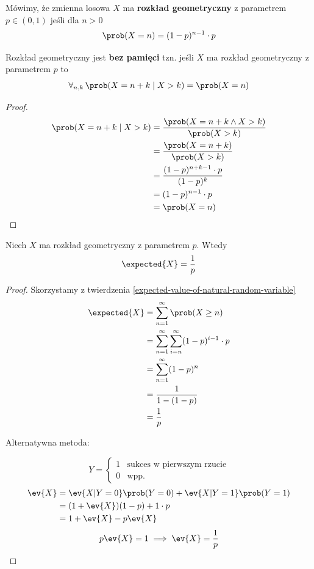\begin{definition}
	Mówimy, że zmienna losowa \( X \) ma \textbf{rozkład geometryczny} z parametrem \( p \in (0, 1) \) jeśli
	dla \( n > 0 \)
	\[
		\prob(X = n) = (1 - p)^{n-1} \cdot p
	\]
\end{definition}

\begin{theorem}[Lemat 2.8 P\&C]
	\label{geometric-is-memoryless}
	Rozkład geometryczny jest \textbf{bez pamięci} tzn. jeśli \( X \) ma rozkład geometryczny z parametrem \( p \) to
	\[
		\forall_{n, k} \, \prob(X = n + k \mid X > k) = \prob(X = n)
	\]
\end{theorem}
\begin{proof}
	\begin{align*}
		\prob(X = n + k \mid X > k)
		 & = \frac{\prob(X = n + k \land X > k)}{\prob(X > k)} \\
		 & = \frac{\prob(X = n + k)}{\prob(X > k)}             \\
		 & = \frac{(1 - p)^{n + k - 1} \cdot p}{(1-p)^k}       \\
		 & = (1 - p)^{n - 1} \cdot p                           \\
		 & = \prob(X = n)
	\end{align*}
\end{proof}

\begin{theorem}
	\label{geometric-expected-value}
	Niech \( X \) ma rozkład geometryczny z parametrem \( p \). Wtedy
	\[
		\expected{X} = \frac{1}{p}
	\]
\end{theorem}
\begin{proof}
	Skorzystamy z twierdzenia \ref{expected-value-of-natural-random-variable}
	\begin{align*}
		\expected{X}
		 & = \sum_{n=1}^\infty \prob(X \geq n)                       \\
		 & = \sum_{n=1}^\infty \sum_{i=n}^\infty (1-p)^{i-1} \cdot p \\
		 & = \sum_{n=1}^\infty (1-p)^n                               \\
		 & = \frac{1}{1 - (1-p)}                                     \\
		 & = \frac{1}{p}
	\end{align*}

	Alternatywna metoda:

	\[
		Y = \begin{cases}
			1 & \text{sukces w pierwszym rzucie} \\
			0 & \text{wpp.}
		\end{cases}
	\]
	\begin{align*}
		\ev{X} & = \ev{X|Y=0}\prob(Y=0) + \ev{X|Y=1}\prob(Y=1) \\
		       & = (1+\ev{X})(1-p) + 1 \cdot p                 \\
		       & = 1 + \ev{X} - p \ev{X}
	\end{align*}
	\[
		p \ev{X} = 1 \implies \ev{X} = \frac{1}{p}
	\]
\end{proof}

